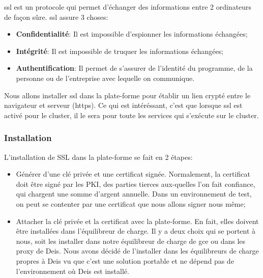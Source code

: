 \begin{onehalfspace}
\acrshort{ssl} est un protocole qui permet d'échanger des informations entre 2 ordinateurs de façon sûre. \acrshort{ssl} assure 3 choses:

\begin{itemize}
	\item \textbf{Confidentialité}: Il est impossible d'espionner les informations échangées;
	\item \textbf{Intégrité}: Il est impossible de truquer les informations échangées;
	\item \textbf{Authentification}: Il permet de s'assurer de l'identité du programme, de la personne ou de l'entreprise avec lequelle on communique.
\end{itemize}



Nous allons installer \acrshort{ssl} dans la plate-forme pour établir un lien crypté entre le navigateur et serveur (\acrshort{https}). Ce qui est intéréssant, c'est que lorsque \acrshort{ssl} est activé pour le cluster, il le sera pour toute les services qui s'exécute sur le cluster.


\subsubsection{Installation}

L'installation de SSL dans la plate-forme se fait en 2 étapes:
\begin{itemize}
	\item Générer d'une clé privée et une certificat signée. Normalement, la certificat doit être signé par les PKI, des parties tierces aux-quelles l'on fait confiance, qui chargent une somme d'argent annuelle. Dans un environnement de test, on peut se contenter par une certificat que nous allons signer nous même;
	\item Attacher la clé privée et la certificat avec la plate-forme. En fait, elles doivent être installées dans l'équilibreur de charge. Il y a deux choix qui se portent à nous, soit les installer dans notre équilibreur de charge de \acrshort{gce} ou dans les proxy de Deis. Nous avons décidé de l'installer dans les équilibreurs de charge propres à Deis vu que c'est une solution portable et ne dépend pas de l'environnement où Deis est installé.
\end{itemize}


\end{onehalfspace}
